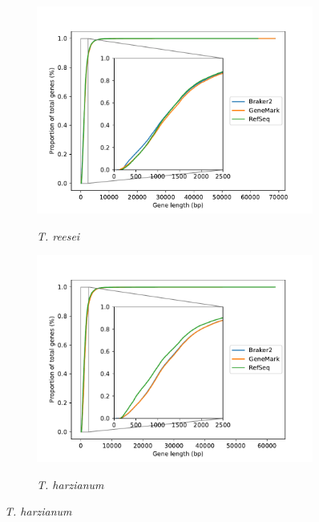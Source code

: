 \begin{figure}[ht]
  \ContinuedFloat
  \centering
    \begin{subfigure}{0.8\textwidth}
      \includegraphics[width=\textwidth]{figures/t-reesei-gene-cdf.pdf}
      \label{fig:treesei-lengths}
      \caption{\textit{T. reesei}}
    \end{subfigure}
    \begin{subfigure}{0.8\textwidth}
      \includegraphics[width=\textwidth]{figures/t-harzianum-gene-cdf.pdf}
      \label{fig:tharzianum-lengths}
      \caption{\textit{T. harzianum}}
    \end{subfigure}
\end{figure}
